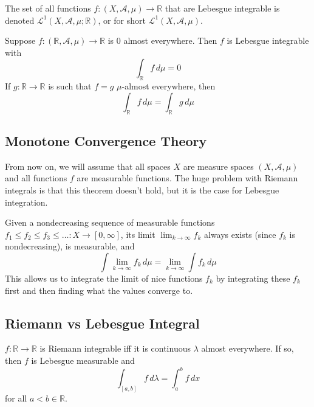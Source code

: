 \documentclass{article}
\begin{document}
\begin{definition}
  The set of all functions $f: (X, \mathcal{A}, \mu) \longrightarrow \mathbb{R}$ that are Lebesgue integrable is denoted $\mathcal{L}^1(X, \mathcal{A}, \mu; \mathbb{R})$, or for short $\mathcal{L}^1(X, \mathcal{A}, \mu)$. 
\end{definition}

\begin{theorem}
  Suppose $f: (\mathbb{R}, \mathcal{A}, \mu) \longrightarrow \mathbb{R}$ is $0$ almost everywhere. Then $f$ is Lebesgue integrable with 
  \[\int_\mathbb{R} f \, d\mu = 0 \]
  If $g: \mathbb{R} \longrightarrow \mathbb{R}$ is such that $f = g$ $\mu$-almost everywhere, then
  \[\int_\mathbb{R} f\, d\mu = \int_\mathbb{R} g \, d\mu\]
\end{theorem}

\subsection{Monotone Convergence Theory}

From now on, we will assume that all spaces $X$ are measure spaces $(X, \mathcal{A}, \mu)$ and all functions $f$ are measurable functions. The huge problem with Riemann integrals is that this theorem doesn't hold, but it is the case for Lebesgue integration. 

\begin{theorem}
  Given a nondecreasing sequence of measurable functions $f_1 \leq f_2 \leq f_3 \leq \ldots : X \longrightarrow [0, \infty]$, its limit $\lim_{k \rightarrow \infty} f_k$ always exists (since $f_k$ is nondecreasing), is measurable, and 
  \[\int \lim_{k \rightarrow \infty} f_k \, d\mu = \lim_{k \rightarrow \infty} \int f_k \, d\mu\]
  This allows us to integrate the limit of nice functions $f_k$ by integrating these $f_k$ first and then finding what the values converge to. 
\end{theorem}

\subsection{Riemann vs Lebesgue Integral}

\begin{theorem}
  $f: \mathbb{R} \longrightarrow \mathbb{R}$ is Riemann integrable iff it is continuous $\lambda$ almost everywhere. If so, then $f$ is Lebesgue measurable and 
  \[\int_{[a, b]} f \,d\lambda = \int_a^b f \, dx\]
  for all $a < b \in \mathbb{R}$. 
\end{theorem}
\end{document}
